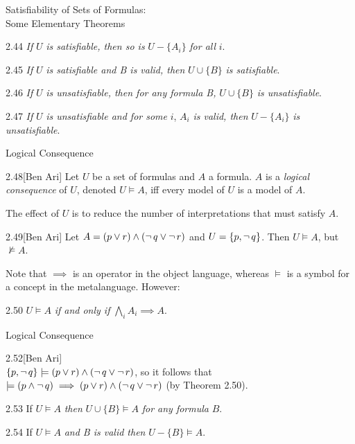 \documentclass[style=sailor,size=12pt]{powerdot}
\begin{document}
\begin{wideslide}[bm=,toc=]{Satisfiability of Sets of Formulas:\\ Some Elementary
Theorems}
\begin{thm}{2.44}
{ \em If} $U$ {\em is satisfiable, then so is} $U - \{A_i\}$ {\em for all} $i$. 
\end{thm}
\begin{thm}{2.45}
{ \em If} $U$ {\em is satisfiable and B is valid, then} $U \cup \{B\}$ {\em is
  satisfiable}. 
\end{thm}
\begin{thm}{2.46}
{ \em If} $U$ {\em is unsatisfiable, then for any formula B,} $U \cup \{B\}$ {\em is
  unsatisfiable}. 
\end{thm}
\begin{thm}{2.47}
{ \em If} $U$ {\em is unsatisfiable and for some } $i$, $A_i$ { \em is valid,
  then} $U - \{A_i\}$ {\em is unsatisfiable}. 
\end{thm}
\end{wideslide}

\begin{wideslide}[bm=,toc=]{Logical Consequence}
\begin{defn}{2.48}[Ben Ari]
Let $U$ be a set of formulas and $A$ a formula. $A$ is a \emph{logical
  consequence} of $U$, denoted $U \models A$, iff every model of $U$ is a
  model of $A$.
\end{defn}
The effect of $U$ is to reduce the number of interpretations that must satisfy
$A$.
\begin{ex}{2.49}[Ben Ari]
Let $A = (p \lor r) \land (\mathop{\neg} q \lor \mathop{\neg} r)$ and $U = \{p,\mathop{\neg} q\}$.
Then $U \models A$, but $\not\models A$.
\end{ex}
Note that $\implies$ is an operator in the object language, whereas $\models$
is a symbol for a concept in the metalanguage. However:
\begin{thm}{2.50}
$U \models A$ \emph{if and only if } $\bigwedge\limits_{i} A_i \implies A$. 
\end{thm}
\end{wideslide}

\begin{wideslide}[bm=,toc=]{Logical Consequence}
\begin{ex}{2.52}[Ben Ari]
~\\
$\{p,\mathop{\neg} q\} \models (p \lor r) \land (\mathop{\neg} q \lor \mathop{\neg} r)$, so it follows that\\
$\models (p \land \mathop{\neg} q) \implies (p \lor r) \land (\mathop{\neg} q \lor \mathop{\neg} r)$
(by Theorem 2.50).
\end{ex}
\begin{thm}{2.53}
If $U \models A$ \emph{then} $U \cup \{B\} \models A$ \emph{for any formula} $B$. 
\end{thm}
\begin{thm}{2.54}
If $U \models A$ \emph{ and B is valid then} $U - \{B\} \models A$. 
\end{thm}

\end{wideslide}
\end{document}
